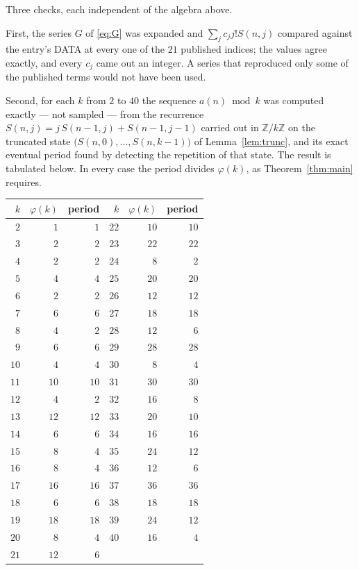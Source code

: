 \documentclass[11pt,a4paper]{article}
\theoremstyle{plain}
\theoremstyle{definition}
\begin{document}
Three checks, each independent of the algebra above.

First, the series $G$ of \eqref{eq:G} was expanded and $\sum_j c_j j! S(n,j)$ compared
against the entry's DATA at every one of the $21$ published indices; the values
agree exactly, and every $c_j$ came out an integer. A series that reproduced only some of
the published terms would not have been used.

Second, for each $k$ from $2$ to $40$ the sequence $a(n)\bmod k$ was computed exactly
--- not sampled --- from the recurrence $S(n,j)=j\,S(n-1,j)+S(n-1,j-1)$ carried out in
$\mathbb{Z}/k\mathbb{Z}$ on the truncated state
$\bigl(S(n,0),\dots,S(n,k-1)\bigr)$ of Lemma~\ref{lem:trunc}, and its exact eventual
period found by detecting the repetition of that state. The result is tabulated below.
In every case the period divides $\varphi(k)$, as Theorem~\ref{thm:main} requires.

\begin{center}\small
\begin{tabular}{rrr@{\qquad\qquad}rrr}
$k$ & $\varphi(k)$ & period & $k$ & $\varphi(k)$ & period \\ \hline
$2$ & $1$ & $1$ & $22$ & $10$ & $10$ \\
$3$ & $2$ & $2$ & $23$ & $22$ & $22$ \\
$4$ & $2$ & $2$ & $24$ & $8$ & $2$ \\
$5$ & $4$ & $4$ & $25$ & $20$ & $20$ \\
$6$ & $2$ & $2$ & $26$ & $12$ & $12$ \\
$7$ & $6$ & $6$ & $27$ & $18$ & $18$ \\
$8$ & $4$ & $2$ & $28$ & $12$ & $6$ \\
$9$ & $6$ & $6$ & $29$ & $28$ & $28$ \\
$10$ & $4$ & $4$ & $30$ & $8$ & $4$ \\
$11$ & $10$ & $10$ & $31$ & $30$ & $30$ \\
$12$ & $4$ & $2$ & $32$ & $16$ & $8$ \\
$13$ & $12$ & $12$ & $33$ & $20$ & $10$ \\
$14$ & $6$ & $6$ & $34$ & $16$ & $16$ \\
$15$ & $8$ & $4$ & $35$ & $24$ & $12$ \\
$16$ & $8$ & $4$ & $36$ & $12$ & $6$ \\
$17$ & $16$ & $16$ & $37$ & $36$ & $36$ \\
$18$ & $6$ & $6$ & $38$ & $18$ & $18$ \\
$19$ & $18$ & $18$ & $39$ & $24$ & $12$ \\
$20$ & $8$ & $4$ & $40$ & $16$ & $4$ \\
$21$ & $12$ & $6$ &  & & \\
\end{tabular}
\end{center}
\end{document}
